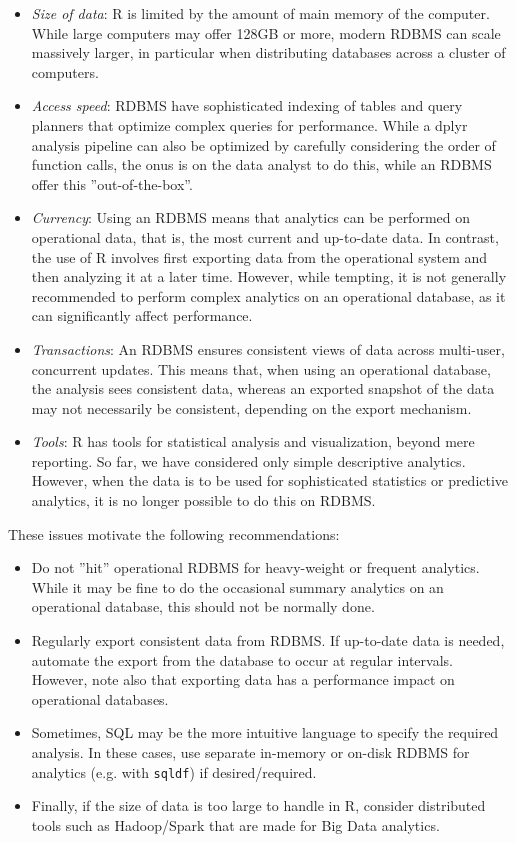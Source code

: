 \begin{itemize}
 \item \emph{Size of data}: R is limited by the amount of main memory of the computer. While large computers may offer 128GB or more, modern RDBMS can scale massively larger, in particular when distributing databases across a cluster of computers.
 \item \emph{Access speed}: RDBMS have sophisticated indexing of tables and query planners that optimize complex queries for performance. While a dplyr analysis pipeline can also be optimized by carefully considering the order of function calls, the onus is on the data analyst to do this, while an RDBMS offer this ''out-of-the-box''.
 \item \emph{Currency}: Using an RDBMS means that analytics can be performed on operational data, that is, the most current and up-to-date data. In contrast, the use of R involves first exporting data from the operational system and then analyzing it at a later time. However, while tempting, it is not generally recommended to perform complex analytics on an operational database, as it can significantly affect performance. 
 \item \emph{Transactions}: An RDBMS ensures consistent views of data across multi-user, concurrent updates. This means that, when using an operational database, the analysis sees consistent data, whereas an exported snapshot of the data may not necessarily be consistent, depending on the export mechanism.
 \item \emph{Tools}: R has tools for statistical analysis and visualization, beyond mere reporting. So far, we have considered only simple descriptive analytics. However, when the data is to be used for sophisticated statistics or predictive analytics, it is no longer possible to do this on RDBMS.
\end{itemize}

\noindent These issues motivate the following recommendations:
\begin{itemize}
 \item Do not ''hit'' operational RDBMS for heavy-weight or frequent analytics. While it may be fine to do the occasional summary analytics on an operational database, this should not be normally done. 
 \item Regularly export consistent data from RDBMS. If up-to-date data is needed, automate the export from the database to occur at regular intervals. However, note also that exporting data has a performance impact on operational databases. 
 \item Sometimes, SQL may be the more intuitive language to specify the required analysis. In these cases, use separate in-memory or on-disk RDBMS for analytics (e.g. with \texttt{sqldf}) if desired/required. 
 \item Finally, if the size of data is too large to handle in R, consider distributed tools such as Hadoop/Spark that are made for Big Data analytics.
\end{itemize}

